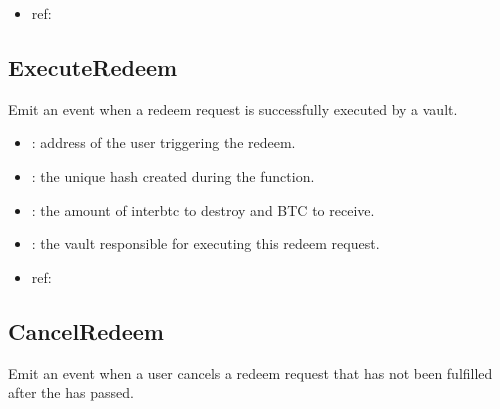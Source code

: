 \documentclass[a4paper,10pt,english]{sphinxmanual}
\begin{document}
\begin{itemize}
\item {} 
ref:

\end{itemize}


\subsection{ExecuteRedeem}
\label{\detokenize{spec/redeem:id16}}
Emit an event when a redeem request is successfully executed by a vault.



\begin{itemize}
\item {} 
: address of the user triggering the redeem.

\item {} 
: the unique hash created during the  function.

\item {} 
: the amount of interbtc to destroy and BTC to receive.

\item {} 
: the vault responsible for executing this redeem request.

\end{itemize}

\begin{itemize}
\item {} 
ref:

\end{itemize}


\subsection{CancelRedeem}
\label{\detokenize{spec/redeem:id17}}
Emit an event when a user cancels a redeem request that has not been fulfilled after the  has passed.

\end{document}
